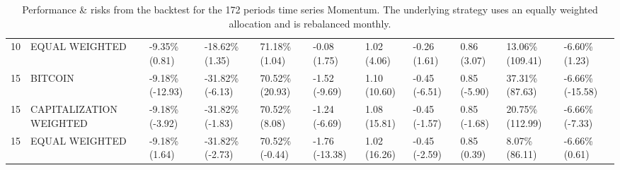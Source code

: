 \documentclass{article}
\begin{document}
\begin{landscape}
\begin{table}[H]
\begin{tabular}{p{0.4cm}|p{3cm}|p{1.65cm}|p{1.65cm}|p{1.65cm}|p{1.65cm}|p{1.65cm}|p{1.65cm}|p{1.65cm}|p{1.65cm}|p{1.65cm}}
\\ 
10&EQUAL WEIGHTED&-9.35\% (0.81)&-18.62\% (1.35)&71.18\% (1.04)&-0.08 (1.75)&1.02 (4.06)&-0.26 (1.61)&0.86 (3.07)&13.06\% (109.41)&-6.60\% (1.23)
\\ 
15&BITCOIN&-9.18\% (-12.93)&-31.82\% (-6.13)&70.52\% (20.93)&-1.52 (-9.69)&1.10 (10.60)&-0.45 (-6.51)&0.85 (-5.90)&37.31\% (87.63)&-6.66\% (-15.58)
\\ 
15&CAPITALIZATION WEIGHTED&-9.18\% (-3.92)&-31.82\% (-1.83)&70.52\% (8.08)&-1.24 (-6.69)&1.08 (15.81)&-0.45 (-1.57)&0.85 (-1.68)&20.75\% (112.99)&-6.66\% (-7.33)
\\ 
15&EQUAL WEIGHTED&-9.18\% (1.64)&-31.82\% (-2.73)&70.52\% (-0.44)&-1.76 (-13.38)&1.02 (16.26)&-0.45 (-2.59)&0.85 (0.39)&8.07\% (86.11)&-6.66\% (0.61)
\\ 
\bottomrule
  \end{tabular}
  \label{tab:tsmom172equalweight}
   \caption{Performance \& risks from the backtest for the 172 periods time series Momentum. The underlying strategy uses an equally weighted allocation and is rebalanced monthly.}
\end{table}
\end{landscape}
\end{document}
